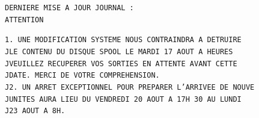 \texttt{DERNIERE MISE A JOUR  JOURNAL : }\\
\texttt{ATTENTION }

\texttt{\hspace{1em}1. UNE MODIFICATION SYSTEME NOUS CONTRAINDRA A DETRUIRE}\\
\texttt{J\hspace{2em}LE CONTENU DU DISQUE SPOOL LE MARDI 17 AOUT A  HEURES}\\
\texttt{J\hspace{2em}VEUILLEZ RECUPERER VOS SORTIES EN ATTENTE AVANT CETTE}\\
\texttt{J\hspace{2em}DATE. MERCI DE VOTRE COMPREHENSION.}\\
\texttt{J\hspace{1em}2. UN ARRET EXCEPTIONNEL POUR PREPARER L'ARRIVEE DE NOUVE}\\
\texttt{J\hspace{2em}UNITES AURA LIEU DU VENDREDI 20 AOUT A 17H 30 AU LUNDI}\\
\texttt{J\hspace{2em}23 AOUT A 8H.}



